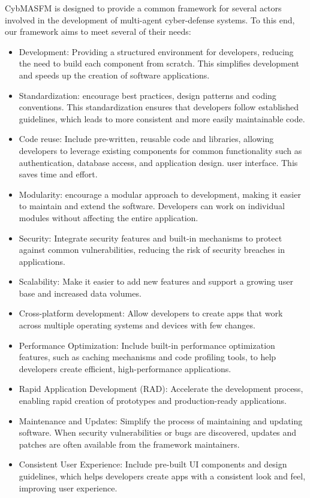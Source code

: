 \documentclass[conference]{IEEEtran}
\begin{document}
CybMASFM is designed to provide a common framework for several actors involved in the development of multi-agent cyber-defense systems. To this end, our framework aims to meet several of their needs:
\begin{itemize}
    \item Development: Providing a structured environment for developers, reducing the need to build each component from scratch. This simplifies development and speeds up the creation of software applications.
    \item Standardization: encourage best practices, design patterns and coding conventions. This standardization ensures that developers follow established guidelines, which leads to more consistent and more easily maintainable code.
    \item Code reuse: Include pre-written, reusable code and libraries, allowing developers to leverage existing components for common functionality such as authentication, database access, and application design. user interface. This saves time and effort.
    \item Modularity: encourage a modular approach to development, making it easier to maintain and extend the software. Developers can work on individual modules without affecting the entire application.
    \item Security: Integrate security features and built-in mechanisms to protect against common vulnerabilities, reducing the risk of security breaches in applications.
    \item Scalability: Make it easier to add new features and support a growing user base and increased data volumes.
    \item Cross-platform development: Allow developers to create apps that work across multiple operating systems and devices with few changes.
    \item Performance Optimization: Include built-in performance optimization features, such as caching mechanisms and code profiling tools, to help developers create efficient, high-performance applications.
    \item Rapid Application Development (RAD): Accelerate the development process, enabling rapid creation of prototypes and production-ready applications.
    \item Maintenance and Updates: Simplify the process of maintaining and updating software. When security vulnerabilities or bugs are discovered, updates and patches are often available from the framework maintainers.
    \item Consistent User Experience: Include pre-built UI components and design guidelines, which helps developers create apps with a consistent look and feel, improving user experience.

\end{itemize}
\end{document}
